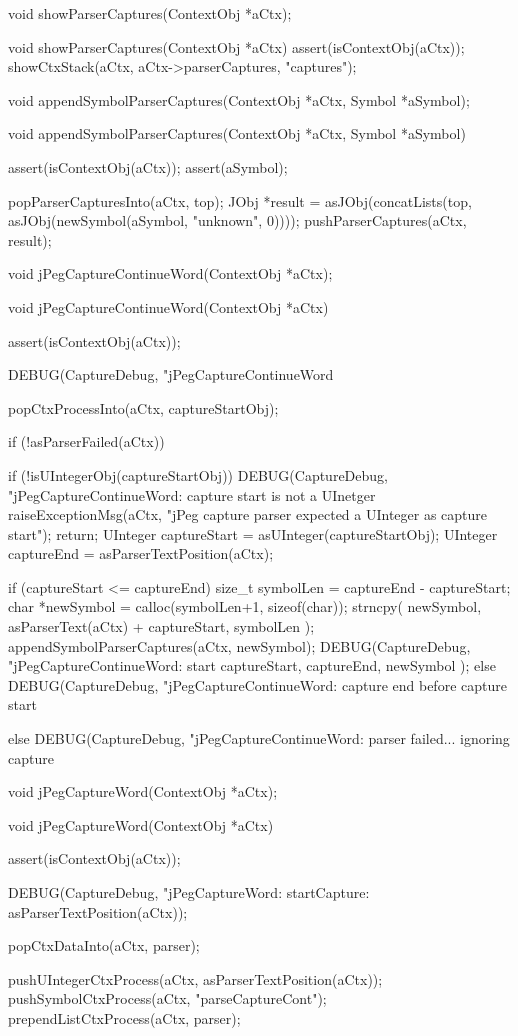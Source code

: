 \startCHeader
void showParserCaptures(ContextObj *aCtx);
\stopCHeader

\startCCode
void showParserCaptures(ContextObj *aCtx) {
  assert(isContextObj(aCtx));
  showCtxStack(aCtx, aCtx->parserCaptures, "captures");
}
\stopCCode

\startCHeader
void appendSymbolParserCaptures(ContextObj *aCtx, Symbol *aSymbol);
\stopCHeader

\startCCode
void appendSymbolParserCaptures(ContextObj *aCtx, Symbol *aSymbol) {
  assert(isContextObj(aCtx));
  assert(aSymbol);
  
  popParserCapturesInto(aCtx, top);
  JObj *result =
    asJObj(concatLists(top,
      asJObj(newSymbol(aSymbol, "unknown", 0))));
  pushParserCaptures(aCtx, result);
}
\stopCCode

\startCHeader
void jPegCaptureContinueWord(ContextObj *aCtx);
\stopCHeader

\startCCode
void jPegCaptureContinueWord(ContextObj *aCtx){
  assert(isContextObj(aCtx));
  
  DEBUG(CaptureDebug, "jPegCaptureContinueWord%
  
  popCtxProcessInto(aCtx, captureStartObj);
  
  if (!asParserFailed(aCtx)) {
    if (!isUIntegerObj(captureStartObj)) {
      DEBUG(CaptureDebug,
        "jPegCaptureContinueWord: capture start is not a UInetger%
      raiseExceptionMsg(aCtx,
        "jPeg capture parser expected a UInteger as capture start");
      return;
    }
    UInteger captureStart = asUInteger(captureStartObj);
    UInteger captureEnd   = asParserTextPosition(aCtx);
    
    if (captureStart <= captureEnd) {
      size_t symbolLen = captureEnd - captureStart;
      char *newSymbol = calloc(symbolLen+1, sizeof(char));
      strncpy(
        newSymbol,
        asParserText(aCtx) + captureStart,
        symbolLen
      );
      appendSymbolParserCaptures(aCtx, newSymbol);
      DEBUG(CaptureDebug,
        "jPegCaptureContinueWord: start %
        captureStart, captureEnd, newSymbol
      );
    } else {
      DEBUG(CaptureDebug,
        "jPegCaptureContinueWord: capture end before capture start%
    }
  } else {
    DEBUG(CaptureDebug,
      "jPegCaptureContinueWord: parser failed... ignoring capture%
  }
  
}
\stopCCode

\startCHeader
void jPegCaptureWord(ContextObj *aCtx);
\stopCHeader

\startCCode
void jPegCaptureWord(ContextObj *aCtx){
  assert(isContextObj(aCtx));
  
  DEBUG(CaptureDebug, "jPegCaptureWord: startCapture: %
    asParserTextPosition(aCtx));

  popCtxDataInto(aCtx, parser);
    
  pushUIntegerCtxProcess(aCtx, asParserTextPosition(aCtx));
  pushSymbolCtxProcess(aCtx, "parseCaptureCont");
  prependListCtxProcess(aCtx, parser);
}
\stopCCode